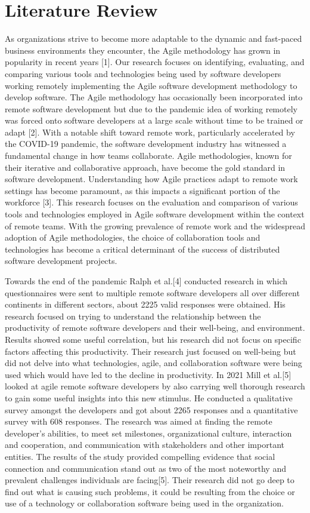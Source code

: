 \documentclass[conference]{IEEEtran}
\begin{document}
\section{Literature Review}
As organizations strive to become more adaptable to the dynamic and fast-paced business environments they encounter, the Agile methodology has grown in popularity in recent years [1]. Our research focuses on identifying, evaluating, and comparing various tools and technologies being used by software developers working remotely implementing the Agile software development methodology to develop software. The Agile methodology has occasionally been incorporated into remote software development but due to the pandemic idea of working remotely was forced onto software developers at a large scale without time to be trained or adapt [2]. With a notable shift toward remote work, particularly accelerated by the COVID-19 pandemic, the software development industry has witnessed a fundamental change in how teams collaborate. Agile methodologies, known for their iterative and collaborative approach, have become the gold standard in software development. Understanding how Agile practices adapt to remote work settings has become paramount, as this impacts a significant portion of the workforce [3]. This research focuses on the evaluation and comparison of various tools and technologies employed in Agile software development within the context of remote teams. With the growing prevalence of remote work and the widespread adoption of Agile methodologies, the choice of collaboration tools and technologies has become a critical determinant of the success of distributed software development projects.

Towards the end of the pandemic Ralph et al.[4] conducted research in which questionnaires were sent to multiple remote software developers all over different continents in different sectors, about 2225 valid responses were obtained. His research focused on trying to understand the relationship between the productivity of remote software developers and their well-being, and environment. Results showed some useful correlation, but his research did not focus on specific factors affecting this productivity. Their research just focused on well-being but did not delve into what technologies, agile, and collaboration software were being used which would have led to the decline in productivity. In 2021 Mill et al.[5] looked at agile remote software developers by also carrying well thorough research to gain some useful insights into this new stimulus. He conducted a qualitative survey amongst the developers and got about 2265 responses and a quantitative survey with 608 responses. The research was aimed at finding the remote developer’s abilities, to meet set milestones, organizational culture, interaction and cooperation, and communication with stakeholders and other important entities. The results of the study provided compelling evidence that social connection and communication stand out as two of the most noteworthy and prevalent challenges individuals are facing[5]. Their research did not go deep to find out what is causing such problems, it could be resulting from the choice or use of a technology or collaboration software being used in the organization. 
\end{document}
